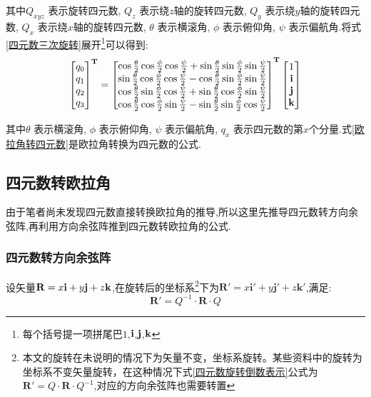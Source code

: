 其中$Q_{xyz}$   表示旋转四元数,
$Q_{z}$         表示绕$z$轴的旋转四元数,
$Q_{y}$         表示绕$y$轴的旋转四元数,
$Q_{x}$         表示绕$x$轴的旋转四元数,
$\theta$        表示横滚角,
$\phi$          表示俯仰角,
$\psi$          表示偏航角.将式\ref{四元数三次旋转}展开\footnote{每个括号提一项拼尾巴$1$,$\mathbf{i}$,$\mathbf{j}$,$\mathbf{k}$}可以得到:
\begin{equation}\label{欧拉角转四元数}
    \begin{split}
        \left[\begin{matrix}
                q_0 \\
                q_1 \\
                q_2 \\
                q_3
        \end{matrix}\right]^\mathbf{T}
        =
        \left[\begin{matrix}
                \cos\frac{\theta}{2}\cos\frac{\phi}{2}\cos\frac{\psi}{2} + \sin\frac{\theta}{2}\sin\frac{\phi}{2}\sin\frac{\psi}{2} \\
                \sin\frac{\theta}{2}\cos\frac{\phi}{2}\cos\frac{\psi}{2} - \cos\frac{\theta}{2}\sin\frac{\phi}{2}\sin\frac{\psi}{2} \\
                \cos\frac{\theta}{2}\sin\frac{\phi}{2}\cos\frac{\psi}{2} + \sin\frac{\theta}{2}\cos\frac{\phi}{2}\sin\frac{\psi}{2} \\
                \cos\frac{\theta}{2}\cos\frac{\phi}{2}\sin\frac{\psi}{2} - \sin\frac{\theta}{2}\sin\frac{\phi}{2}\cos\frac{\psi}{2}
        \end{matrix}\right]^\mathbf{T}
        \left[\begin{matrix}
                1 \\
                \mathbf{i} \\
                \mathbf{j} \\
                \mathbf{k} \\
        \end{matrix}\right]
    \end{split}
\end{equation} 

其中$\theta$    表示横滚角,
$\phi$          表示俯仰角,
$\psi$          表示偏航角,
$q_x$           表示四元数的第$x$个分量.式\ref{欧拉角转四元数}是欧拉角转换为四元数的公式.

\subsection{四元数转欧拉角}
由于笔者尚未发现四元数直接转换欧拉角的推导,所以这里先推导四元数转方向余弦阵,再利用方向余弦阵推到四元数转欧拉角的公式.
\subsubsection{四元数转方向余弦阵}
设矢量$\mathbf{R}=x\mathbf{i}+y\mathbf{j}+z\mathbf{k}$,在\textcolor[rgb]{1,0,0}{旋转后的坐标系}\footnote{本文的旋转在未说明的情况下为矢量不变，坐标系旋转。某些资料中的旋转为坐标系不变矢量旋转，在这种情况下式\ref{四元数旋转倒数表示}公式为$\mathbf{R}' = Q \cdot \mathbf{R} \cdot Q^{-1}$,对应的方向余弦阵也需要转置\cite{惯性技术}}下为$\mathbf{R'}=x\mathbf{i'}+y\mathbf{j'}+z\mathbf{k'}$,满足:
\begin{equation}\label{四元数旋转倒数表示}
    \mathbf{R'}=Q^{-1} \cdot \mathbf{R} \cdot Q
\end{equation} 

